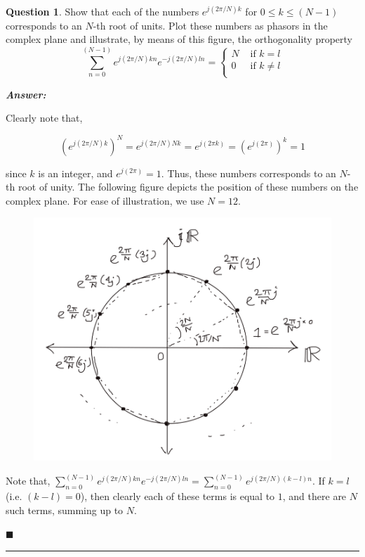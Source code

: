\documentclass[12pt]{article}
\theoremstyle{definition}
\newtheorem{question}{Question}
\newenvironment{answer}{
    \textbf{\textit{Answer:}} \qquad
}{\hfill $\blacksquare$ \\ \begin{center}
    \rule{0.6\linewidth}{0.5px}    
\end{center}
}
\begin{document}
\begin{question}
    Show that each of the numbers $e^{j(2\pi / N)k}$ for $0 \leq k \leq (N-1)$ corresponds to an $N$-th root of units. Plot these numbers as phasors in the complex plane and illustrate, by means of this figure, the orthogonality property
    $$
    \sum_{n = 0}^{(N-1)} e^{j(2\pi / N)kn} e^{-j(2\pi / N)ln} = \begin{cases}
        N & \text{ if } k = l\\
        0 & \text{ if } k \neq l\\
    \end{cases}
    $$
\end{question}

\begin{answer}
    Clearly note that, 

    $$
    \left( e^{j(2\pi / N)k}\right)^N = e^{j(2\pi / N)Nk} = e^{j(2\pi k)} = (e^{j(2\pi)})^k = 1
    $$

    since $k$ is an integer, and $e^{j(2\pi)} = 1$. Thus, these numbers corresponds to an $N$-th root of unity. The following figure depicts the position of these numbers on the complex plane. For ease of illustration, we use $N = 12$.

    \begin{figure}[H]
        \centering
        \includegraphics[width = 0.7\linewidth]{img3.png}
    \end{figure}


    Note that, $\sum_{n = 0}^{(N-1)} e^{j(2\pi / N)kn} e^{-j(2\pi / N)ln} = \sum_{n = 0}^{(N-1)} e^{j(2\pi / N)(k-l)n}$. If $k = l$ (i.e. $(k-l) = 0$), then clearly each of these terms is equal to $1$, and there are $N$ such terms, summing up to $N$.


\end{answer}
\end{document}
